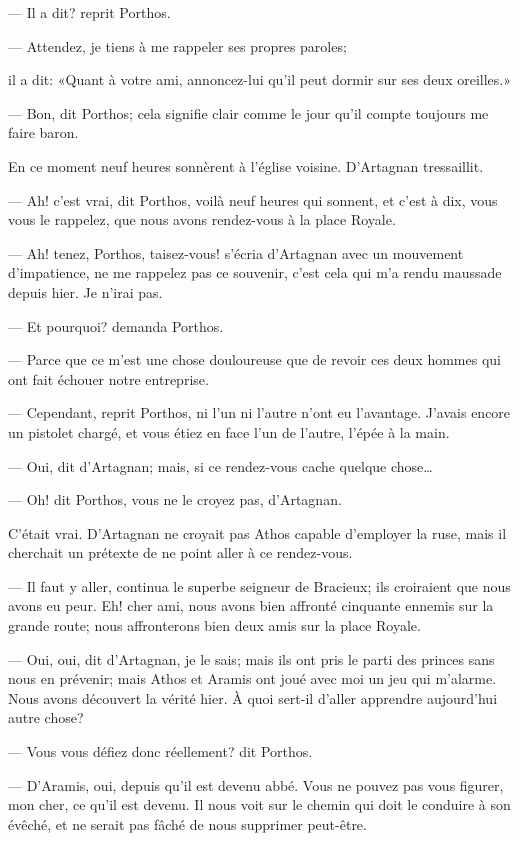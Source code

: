 — Il a dit? reprit Porthos.

— Attendez, je tiens à me rappeler ses propres paroles;

il a dit: «Quant à votre ami, annoncez-lui qu'il peut dormir sur ses deux oreilles.»

— Bon, dit Porthos; cela signifie clair comme le jour qu'il compte toujours me faire baron.

En ce moment neuf heures sonnèrent à l'église voisine. D'Artagnan tressaillit.

— Ah! c'est vrai, dit Porthos, voilà neuf heures qui sonnent, et c'est à dix, vous vous le rappelez, que nous avons rendez-vous à la place Royale.

— Ah! tenez, Porthos, taisez-vous! s'écria d'Artagnan avec un mouvement d'impatience, ne me rappelez pas ce souvenir, c'est cela qui m'a rendu maussade depuis hier. Je n'irai pas.

— Et pourquoi? demanda Porthos.

— Parce que ce m'est une chose douloureuse que de revoir ces deux hommes qui ont fait échouer notre entreprise.

— Cependant, reprit Porthos, ni l'un ni l'autre n'ont eu l'avantage. J'avais encore un pistolet chargé, et vous étiez en face l'un de l'autre, l'épée à la main.

— Oui, dit d'Artagnan; mais, si ce rendez-vous cache quelque chose\dots

— Oh! dit Porthos, vous ne le croyez pas, d'Artagnan.

C'était vrai. D'Artagnan ne croyait pas Athos capable d'employer la ruse, mais il cherchait un prétexte de ne point aller à ce rendez-vous.

— Il faut y aller, continua le superbe seigneur de Bracieux; ils croiraient que nous avons eu peur. Eh! cher ami, nous avons bien affronté cinquante ennemis sur la grande route; nous affronterons bien deux amis sur la place Royale.

— Oui, oui, dit d'Artagnan, je le sais; mais ils ont pris le parti des princes sans nous en prévenir; mais Athos et Aramis ont joué avec moi un jeu qui m'alarme. Nous avons découvert la vérité hier. À quoi sert-il d'aller apprendre aujourd'hui autre chose?

— Vous vous défiez donc réellement? dit Porthos.

— D'Aramis, oui, depuis qu'il est devenu abbé. Vous ne pouvez pas vous figurer, mon cher, ce qu'il est devenu. Il nous voit sur le chemin qui doit le conduire à son évêché, et ne serait pas fâché de nous supprimer peut-être.

